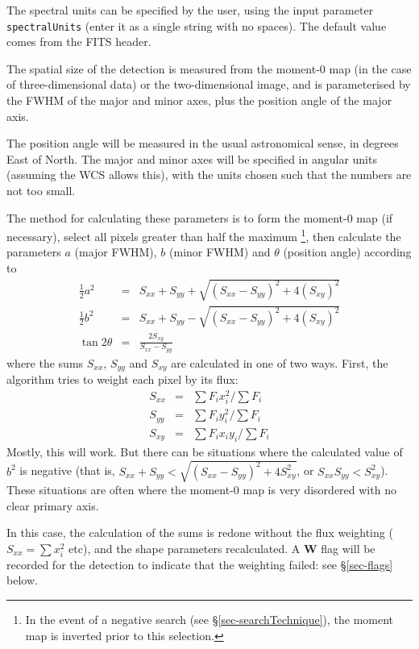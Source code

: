 The spectral units can be specified by the user, using the input
parameter \texttt{spectralUnits} (enter it as a single string with no
spaces). The default value comes from the FITS header. 

\label{sec-shape}

The spatial size of the detection is measured from the moment-0 map
(in the case of three-dimensional data) or the two-dimensional image,
and is parameterised by the FWHM of the major and minor axes, plus the
position angle of the major axis.

The position angle will be measured in the usual astronomical sense,
in degrees East of North. The major and minor axes will be specified
in angular units (assuming the WCS allows this), with the units chosen
such that the numbers are not too small.

The method for calculating these parameters is to form the moment-0
map (if necessary), select all pixels greater than half the maximum
\footnote{In the event of a negative search (see
  \S\ref{sec-searchTechnique}), the moment map is inverted prior to
  this selection.},
then calculate the parameters $a$ (major FWHM), $b$ (minor FWHM) and
$\theta$ (position angle) according to
\begin{eqnarray*}
\frac{1}{2} a^2  &= & S_{xx} + S_{yy} + \sqrt{ (S_{xx} -
  S_{yy})^2 + 4 (S_{xy})^2}\\
\frac{1}{2} b^2  &= & S_{xx} + S_{yy} - \sqrt{ (S_{xx} -
  S_{yy})^2 + 4 (S_{xy})^2}\\
\tan 2\theta &= &\frac{2 S_{xy}}{S_{xx} - S_{yy}}
\end{eqnarray*}
where the sums $S_{xx}$, $S_{yy}$ and $S_{xy}$ are calculated in one
of two ways. First, the algorithm tries to weight each pixel by its
flux:
\begin{eqnarray*}
S_{xx} &= &\sum F_i x_i^2 / \sum F_i\\
S_{yy} &= &\sum F_i y_i^2 / \sum F_i\\
S_{xy} &= &\sum F_i x_i y_i / \sum F_i
\end{eqnarray*}
Mostly, this will work. But there can be situations where the
calculated value of $b^2$ is negative (that is, $S_{xx}+S_{yy} <
\sqrt{(S_{xx}-S_{yy})^2+4S_{xy}^2}$, or $S_{xx}S_{yy}<S_{xy}^2$). These situations are
often where the moment-0 map is very disordered with no clear primary
axis.

In this case, the calculation of the sums is redone without the flux
weighting ($S_{xx} = \sum x_i^2$ etc), and the shape parameters
recalculated. A \textbf{W} flag will be recorded for the detection to
indicate that the weighting failed: see \S\ref{sec-flags} below.

